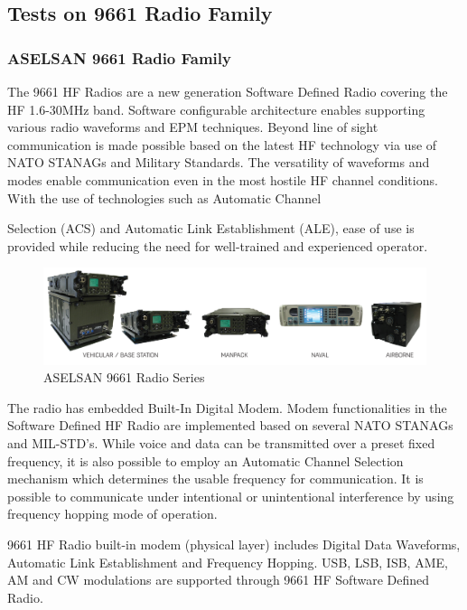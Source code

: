 \subsection{Tests on 9661 Radio Family  }

\subsubsection{ASELSAN 9661 Radio Family}
\- \indent	
	The 9661 HF Radios are a new generation Software Defined Radio covering the HF 1.6-30MHz band. Software configurable architecture enables supporting various radio waveforms and EPM techniques. Beyond line of sight communication is made possible based on the latest HF technology via use of NATO STANAGs and Military Standards. The versatility of waveforms and modes enable communication even in the most hostile HF channel conditions. With the use of technologies such as Automatic Channel

	Selection (ACS) and Automatic Link Establishment (ALE), ease of use is provided while reducing the need for well-trained and experienced operator.

\begin{figure}[H]
	\center
	\setlength{\unitlength}{\textwidth} 
	\includegraphics[width=1.0\unitlength]{radio_type}
	\caption{\label{fig:radtyp}ASELSAN 9661 Radio Series }
\end{figure}

	The radio has embedded Built-In Digital Modem. Modem functionalities in the Software Defined HF Radio are implemented based on several NATO STANAGs and MIL-STD's. While voice and data can be transmitted over a preset fixed frequency, it is also possible to employ an Automatic Channel Selection mechanism which determines the usable frequency for communication. It is possible to communicate under intentional or unintentional interference by using frequency hopping mode of operation.

	9661 HF Radio built-in modem (physical layer) includes Digital Data Waveforms, Automatic Link Establishment and Frequency Hopping. USB, LSB, ISB, AME, AM and CW modulations are supported through 9661 HF Software Defined Radio.  

